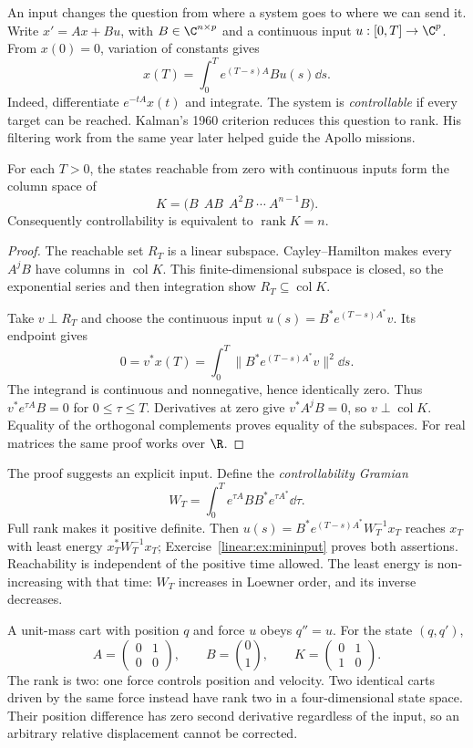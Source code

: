 An input changes the question from where a system goes to where we can send it. Write $x'=Ax+Bu$, with $B\in\C^{n\times p}$ and a continuous input $u:[0,T]\to\C^p$. From $x(0)=0$, variation of constants gives
\[x(T)=\int_0^T e^{(T-s)A}Bu(s)\dd s.
\]
Indeed, differentiate $e^{-tA}x(t)$ and integrate. The system is \emph{controllable} if every target can be reached. Kalman's 1960 criterion reduces this question to rank. His filtering work from the same year later helped guide the Apollo missions.

\begin{theorem}\label{linear:thm:kalman}
For each $T>0$, the states reachable from zero with continuous inputs form the column space of
\[K=\bigl(B\ \ AB\ \ A^2B\ \cdots\ A^{n-1}B\bigr).
\]
Consequently controllability is equivalent to $\operatorname{rank}K=n$.
\end{theorem}
\begin{proof}
The reachable set $R_T$ is a linear subspace. Cayley--Hamilton makes every $A^jB$ have columns in $\operatorname{col}K$. This finite-dimensional subspace is closed, so the exponential series and then integration show $R_T\subseteq\operatorname{col}K$.

Take $v\perp R_T$ and choose the continuous input $u(s)=B^*e^{(T-s)A^*}v$. Its endpoint gives
\[0=v^*x(T)=\int_0^T\|B^*e^{(T-s)A^*}v\|^2\dd s.
\]
The integrand is continuous and nonnegative, hence identically zero. Thus $v^*e^{\tau A}B=0$ for $0\le\tau\le T$. Derivatives at zero give $v^*A^jB=0$, so $v\perp\operatorname{col}K$. Equality of the orthogonal complements proves equality of the subspaces. For real matrices the same proof works over $\R$.
\end{proof}

The proof suggests an explicit input. Define the \emph{controllability Gramian}
\[W_T=\int_0^T e^{\tau A}BB^*e^{\tau A^*}\dd\tau.
\]
Full rank makes it positive definite. Then $u(s)=B^*e^{(T-s)A^*}W_T^{-1}x_T$ reaches $x_T$ with least energy $x_T^*W_T^{-1}x_T$; Exercise~\ref{linear:ex:mininput} proves both assertions. Reachability is independent of the positive time allowed. The least energy is non-increasing with that time: $W_T$ increases in Loewner order, and its inverse decreases.

\begin{example}\label{linear:exa:doubleintegrator}
A unit-mass cart with position $q$ and force $u$ obeys $q''=u$. For the state $(q,q')$,
\[A=\begin{pmatrix}0&1\\0&0\end{pmatrix},\qquad B=\binom01,\qquad K=\begin{pmatrix}0&1\\1&0\end{pmatrix}.
\]
The rank is two: one force controls position and velocity. Two identical carts driven by the same force instead have rank two in a four-dimensional state space. Their position difference has zero second derivative regardless of the input, so an arbitrary relative displacement cannot be corrected.
\end{example}

